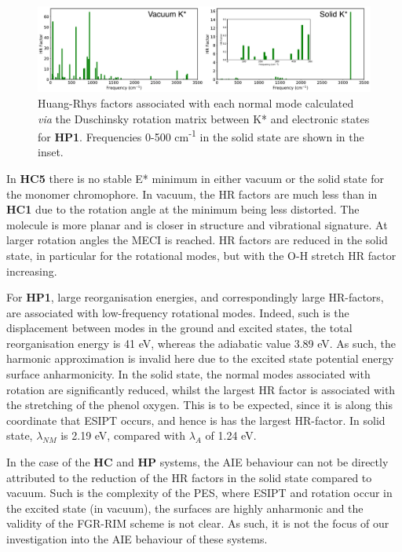 \begin{figure}[t]
\centering
  \includegraphics[width=\linewidth]{5ConnectingCrystalStructure/HP1_DUSHIN}
  \caption[HR factors for \textbf{HP1}]{Huang-Rhys factors associated with each normal mode calculated \textit{via} the Duschinsky rotation matrix between K* and \szero{} electronic states for \textbf{HP1}. Frequencies 0-500 cm\textsuperscript{-1} in the solid state are shown in the inset.}
  \label{figure: HP1_DUSHIN}
\end{figure}

In \textbf{HC5} there is no stable E* minimum in either vacuum or the solid state for the monomer chromophore. In vacuum, the HR factors are much less than in \textbf{HC1} due to the rotation angle at the minimum being less distorted. The molecule is more planar and is closer in structure and vibrational signature. At larger rotation angles the MECI is reached. HR factors are reduced in the solid state, in particular for the rotational modes, but with the O-H stretch HR factor increasing.   %

For \textbf{HP1}, large reorganisation energies, and correspondingly large HR-factors, are associated with low-frequency rotational modes. Indeed, such is the displacement between modes in the ground and excited states, the total reorganisation energy is 41 eV, whereas the adiabatic value 3.89 eV. As such, the harmonic approximation is invalid here due to the excited state potential energy surface anharmonicity. In the solid state, the normal modes associated with rotation are significantly reduced, whilst the largest HR factor is associated with the stretching of the phenol oxygen. This is to be expected, since it is along this coordinate that ESIPT occurs, and hence is has the largest HR-factor. In solid state, $\lambda_{NM}$ is 2.19 eV, compared with $\lambda_{A}$ of 1.24 eV.  

In the case of the \textbf{HC} and \textbf{HP} systems, the AIE behaviour can not be directly attributed to the reduction of the HR factors in the solid state compared to vacuum. Such is the complexity of the PES, where ESIPT and rotation occur in the excited state (in vacuum), the surfaces are highly anharmonic and the validity of the \ac{FGR-RIM} scheme is not clear. As such, it is not the focus of our investigation into the AIE behaviour of these systems.

